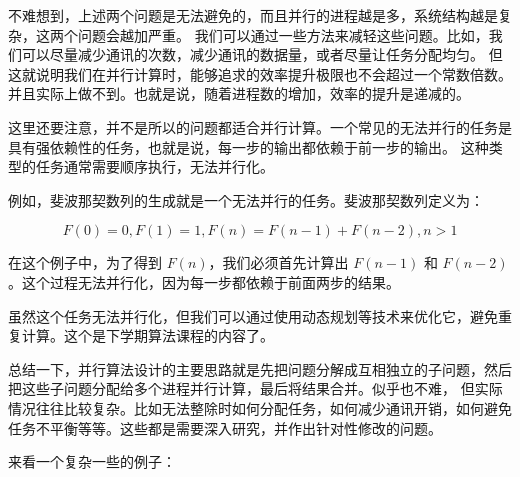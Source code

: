 \documentclass{ctexart}
\begin{document}
不难想到，上述两个问题是无法避免的，而且并行的进程越是多，系统结构越是复杂，这两个问题会越加严重。
我们可以通过一些方法来减轻这些问题。比如，我们可以尽量减少通讯的次数，减少通讯的数据量，或者尽量让任务分配均匀。
但这就说明我们在并行计算时，能够追求的效率提升极限也不会超过一个常数倍数。并且实际上做不到。也就是说，随着进程数的增加，效率的提升是递减的。

这里还要注意，并不是所以的问题都适合并行计算。一个常见的无法并行的任务是具有强依赖性的任务，也就是说，每一步的输出都依赖于前一步的输出。
这种类型的任务通常需要顺序执行，无法并行化。

例如，斐波那契数列的生成就是一个无法并行的任务。斐波那契数列定义为：

$$
F(0) = 0, F(1) = 1, F(n) = F(n-1) + F(n-2), n > 1
$$

在这个例子中，为了得到 $F(n)$，我们必须首先计算出 $F(n-1)$ 和 $F(n-2)$。这个过程无法并行化，因为每一步都依赖于前面两步的结果。

虽然这个任务无法并行化，但我们可以通过使用动态规划等技术来优化它，避免重复计算。这个是下学期算法课程的内容了。

总结一下，并行算法设计的主要思路就是先把问题分解成互相独立的子问题，然后把这些子问题分配给多个进程并行计算，最后将结果合并。似乎也不难，
但实际情况往往比较复杂。比如无法整除时如何分配任务，如何减少通讯开销，如何避免任务不平衡等等。这些都是需要深入研究，并作出针对性修改的问题。

来看一个复杂一些的例子：
\end{document}
